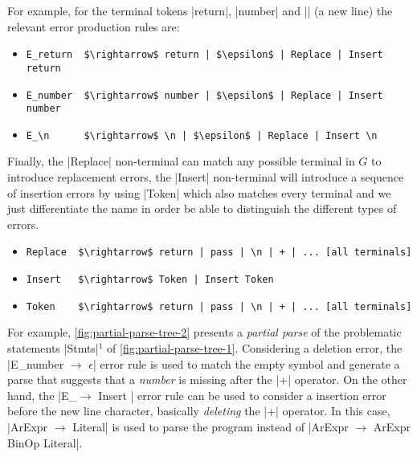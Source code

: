 For example, for the terminal tokens |return|, |number| and |\n| (a new line)
the relevant error production rules are:
\begin{itemize}
  \item \lstinline{E_return  $\rightarrow$ return | $\epsilon$ | Replace | Insert return}
  \item \lstinline{E_number  $\rightarrow$ number | $\epsilon$ | Replace | Insert number}
  \item \lstinline{E_\n      $\rightarrow$ \n | $\epsilon$ | Replace | Insert \n}
\end{itemize}
Finally, the |Replace| non-terminal can match any possible terminal in $G$ to
introduce replacement errors, the |Insert| non-terminal will introduce a
sequence of insertion errors by using |Token| which also matches every terminal
and we just differentiate the name in order be able to distinguish the different
types of errors.
\begin{itemize}
  \item \lstinline{Replace  $\rightarrow$ return | pass | \n | + | ... [all terminals]}
  \item \lstinline{Insert   $\rightarrow$ Token | Insert Token}
  \item \lstinline{Token    $\rightarrow$ return | pass | \n | + | ... [all terminals]}
\end{itemize}







For example, \autoref{fig:partial-parse-tree-2} presents a \emph{partial parse}
of the problematic statements |Stmts|$^1$ of \autoref{fig:partial-parse-tree-1}.
Considering a deletion error, the |E_number $\rightarrow$ $\epsilon$| error rule
is used to match the empty symbol and generate a parse that suggests that a
\emph{number} is missing after the |+| operator. On the other hand, the
%
|E_\n $\rightarrow$ Insert \n| error rule can be used to consider a insertion
error before the new line character, basically \emph{deleting} the |+| operator.
In this case, |ArExpr $\rightarrow$ Literal| is used to parse the program
instead of |ArExpr $\rightarrow$ ArExpr BinOp Literal|.

